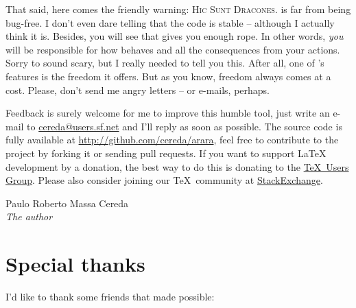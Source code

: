 \documentclass[a4paper,twoside,12pt]{memoir}
\begin{document}
That said, here comes the friendly warning: \textsc{Hic Sunt Dracones}. \arara is far from being bug-free. I don't even dare telling that the code is stable -- although I actually think it is. Besides, you will see that \arara gives you enough rope. In other words, \emph{you} will be responsible for how \arara behaves and all the consequences from your actions. Sorry to sound scary, but I really needed to tell you this. After all, one of \arara's features is the freedom it offers. But as you know, freedom always comes at a cost. Please, don't send me angry letters -- or e-mails, perhaps.

Feedback is surely welcome for me to improve this humble tool, just write an e-mail to \url{cereda@users.sf.net} and I'll reply as soon as possible. The source code is fully available at \url{http://github.com/cereda/arara}, feel free to contribute to the project by forking it or sending pull requests. If you want to support \LaTeX{} development by a donation, the best way to do this is donating to the \href{http://www.tug.org/}{\TeX\ Users Group}. Please also consider joining our \TeX\ community at \href{http://tex.stackexchange.com}{StackExchange}.

\vfill

\begin{flushright}
Paulo Roberto Massa Cereda\\
\emph{The author}
\end{flushright}

\cleardoublepage

\section*{Special thanks}

I'd like to thank some friends that made \arara possible:
\end{document}
